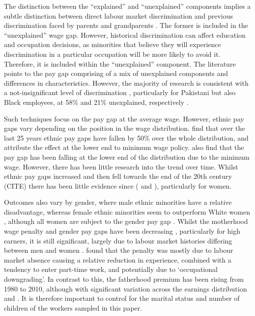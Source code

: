 \documentclass[class=article, crop=false]{standalone}
\begin{document}
The distinction between the \enquote{explained} and \enquote{unexplained} components implies a subtle distinction between direct labour market discrimination and previous discrimination faced by parents and grandparents \citep{Lundberg}. The former is included in the \enquote{unexplained} wage gap. However, historical discrimination can affect education and occupation decisions, as minorities that believe they will experience discrimination in a particular occupation will be more likely to avoid it. Therefore, it is included within the \enquote{unexplained} component. The literature points to the pay gap comprising of a mix of unexplained components and differences in characteristics. However, the majority of research is consistent with a not-insignificant level of discrimination \citep{Metcalf}, particularly for Pakistani but also Black employees, at 58\% and 21\% unexplained, respectively \cite[p.~100]{Blackaby}.

Such techniques focus on the pay gap at the average wage. However, ethnic pay gaps vary depending on the position in the wage distribution. \citet{BoE} find that over the last 25 years ethnic pay gaps have fallen by 50\% over the whole distribution, and attribute the effect at the lower end to minimum wage policy. \citet{Gove} also find that the pay gap has been falling at the lower end of the distribution due to the minimum wage. However, there has been little research into the trend over time. Whilst ethnic pay gaps increased and then fell towards the end of the 20th century (CITE) there has been little evidence since (\citet{Metcalf} and \citet{Blackaby}), particularly for women.

Outcomes also vary by gender, where male ethnic minorities have a relative disadvantage, whereas female ethnic minorities seem to outperform White women \citep{Metcalf}, although all women are subject to the gender pay gap \citep{Heath}. Whilst the motherhood wage penalty and gender pay gaps have been decreasing \citet{BoE}, particularly for high earners, it is still significant, largely due to labour market histories differing between men and women \citep{Olsenb}. \cite[p.~216]{Waldfogel} found that the penalty was mostly due to labour market absence causing a relative reduction in experience, combined with a tendency to enter part-time work, and potentially due to \enquote*{occupational downgrading}. In contrast to this, the fatherhood premium has been rising from 1980 to 2010, although with significant variation across the earnings distribution \citep{Glauber} and \citep{Cooke}. It is therefore important to control for the marital status and number of children of the workers sampled in this paper.
\end{document}
